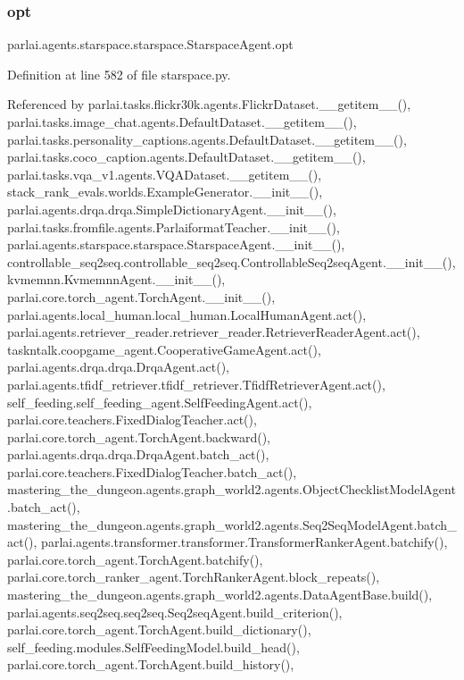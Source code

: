 \subsubsection{\texorpdfstring{opt}{opt}}
{\footnotesize\ttfamily parlai.\+agents.\+starspace.\+starspace.\+Starspace\+Agent.\+opt}



Definition at line 582 of file starspace.\+py.



Referenced by parlai.\+tasks.\+flickr30k.\+agents.\+Flickr\+Dataset.\+\_\+\+\_\+getitem\+\_\+\+\_\+(), parlai.\+tasks.\+image\+\_\+chat.\+agents.\+Default\+Dataset.\+\_\+\+\_\+getitem\+\_\+\+\_\+(), parlai.\+tasks.\+personality\+\_\+captions.\+agents.\+Default\+Dataset.\+\_\+\+\_\+getitem\+\_\+\+\_\+(), parlai.\+tasks.\+coco\+\_\+caption.\+agents.\+Default\+Dataset.\+\_\+\+\_\+getitem\+\_\+\+\_\+(), parlai.\+tasks.\+vqa\+\_\+v1.\+agents.\+V\+Q\+A\+Dataset.\+\_\+\+\_\+getitem\+\_\+\+\_\+(), stack\+\_\+rank\+\_\+evals.\+worlds.\+Example\+Generator.\+\_\+\+\_\+init\+\_\+\+\_\+(), parlai.\+agents.\+drqa.\+drqa.\+Simple\+Dictionary\+Agent.\+\_\+\+\_\+init\+\_\+\+\_\+(), parlai.\+tasks.\+fromfile.\+agents.\+Parlaiformat\+Teacher.\+\_\+\+\_\+init\+\_\+\+\_\+(), parlai.\+agents.\+starspace.\+starspace.\+Starspace\+Agent.\+\_\+\+\_\+init\+\_\+\+\_\+(), controllable\+\_\+seq2seq.\+controllable\+\_\+seq2seq.\+Controllable\+Seq2seq\+Agent.\+\_\+\+\_\+init\+\_\+\+\_\+(), kvmemnn.\+Kvmemnn\+Agent.\+\_\+\+\_\+init\+\_\+\+\_\+(), parlai.\+core.\+torch\+\_\+agent.\+Torch\+Agent.\+\_\+\+\_\+init\+\_\+\+\_\+(), parlai.\+agents.\+local\+\_\+human.\+local\+\_\+human.\+Local\+Human\+Agent.\+act(), parlai.\+agents.\+retriever\+\_\+reader.\+retriever\+\_\+reader.\+Retriever\+Reader\+Agent.\+act(), taskntalk.\+coopgame\+\_\+agent.\+Cooperative\+Game\+Agent.\+act(), parlai.\+agents.\+drqa.\+drqa.\+Drqa\+Agent.\+act(), parlai.\+agents.\+tfidf\+\_\+retriever.\+tfidf\+\_\+retriever.\+Tfidf\+Retriever\+Agent.\+act(), self\+\_\+feeding.\+self\+\_\+feeding\+\_\+agent.\+Self\+Feeding\+Agent.\+act(), parlai.\+core.\+teachers.\+Fixed\+Dialog\+Teacher.\+act(), parlai.\+core.\+torch\+\_\+agent.\+Torch\+Agent.\+backward(), parlai.\+agents.\+drqa.\+drqa.\+Drqa\+Agent.\+batch\+\_\+act(), parlai.\+core.\+teachers.\+Fixed\+Dialog\+Teacher.\+batch\+\_\+act(), mastering\+\_\+the\+\_\+dungeon.\+agents.\+graph\+\_\+world2.\+agents.\+Object\+Checklist\+Model\+Agent.\+batch\+\_\+act(), mastering\+\_\+the\+\_\+dungeon.\+agents.\+graph\+\_\+world2.\+agents.\+Seq2\+Seq\+Model\+Agent.\+batch\+\_\+act(), parlai.\+agents.\+transformer.\+transformer.\+Transformer\+Ranker\+Agent.\+batchify(), parlai.\+core.\+torch\+\_\+agent.\+Torch\+Agent.\+batchify(), parlai.\+core.\+torch\+\_\+ranker\+\_\+agent.\+Torch\+Ranker\+Agent.\+block\+\_\+repeats(), mastering\+\_\+the\+\_\+dungeon.\+agents.\+graph\+\_\+world2.\+agents.\+Data\+Agent\+Base.\+build(), parlai.\+agents.\+seq2seq.\+seq2seq.\+Seq2seq\+Agent.\+build\+\_\+criterion(), parlai.\+core.\+torch\+\_\+agent.\+Torch\+Agent.\+build\+\_\+dictionary(), self\+\_\+feeding.\+modules.\+Self\+Feeding\+Model.\+build\+\_\+head(), parlai.\+core.\+torch\+\_\+agent.\+Torch\+Agent.\+build\+\_\+history(), 